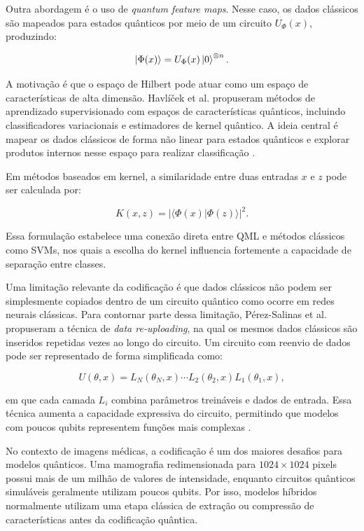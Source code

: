 \documentclass[
    12pt,
    openright,
    oneside,
    a4paper,
    english,
    brazil
]{abntex2}
\begin{document}
Outra abordagem é o uso de \textit{quantum feature maps}. Nesse caso, os dados clássicos são mapeados para estados quânticos por meio de um circuito \(U_{\Phi}(x)\), produzindo:

\[
\ket{\Phi(x)} =
U_{\Phi}(x)\ket{0}^{\otimes n}.
\]

A motivação é que o espaço de Hilbert pode atuar como um espaço de características de alta dimensão. Havlíček et al. propuseram métodos de aprendizado supervisionado com espaços de características quânticos, incluindo classificadores variacionais e estimadores de kernel quântico. A ideia central é mapear os dados clássicos de forma não linear para estados quânticos e explorar produtos internos nesse espaço para realizar classificação \cite{havlicek2019supervised}.

Em métodos baseados em kernel, a similaridade entre duas entradas \(x\) e \(z\) pode ser calculada por:

\[
K(x,z) =
|\langle \Phi(x) | \Phi(z) \rangle|^2.
\]

Essa formulação estabelece uma conexão direta entre QML e métodos clássicos como SVMs, nos quais a escolha do kernel influencia fortemente a capacidade de separação entre classes.

Uma limitação relevante da codificação é que dados clássicos não podem ser simplesmente copiados dentro de um circuito quântico como ocorre em redes neurais clássicas. Para contornar parte dessa limitação, Pérez-Salinas et al. propuseram a técnica de \textit{data re-uploading}, na qual os mesmos dados clássicos são inseridos repetidas vezes ao longo do circuito. Um circuito com reenvio de dados pode ser representado de forma simplificada como:

\[
U(\theta, x)
=
L_N(\theta_N, x)
\cdots
L_2(\theta_2, x)
L_1(\theta_1, x),
\]

em que cada camada \(L_i\) combina parâmetros treináveis e dados de entrada. Essa técnica aumenta a capacidade expressiva do circuito, permitindo que modelos com poucos qubits representem funções mais complexas \cite{perezsalinas2020data}.

No contexto de imagens médicas, a codificação é um dos maiores desafios para modelos quânticos. Uma mamografia redimensionada para \(1024 \times 1024\) pixels possui mais de um milhão de valores de intensidade, enquanto circuitos quânticos simuláveis geralmente utilizam poucos qubits. Por isso, modelos híbridos normalmente utilizam uma etapa clássica de extração ou compressão de características antes da codificação quântica.
\end{document}
